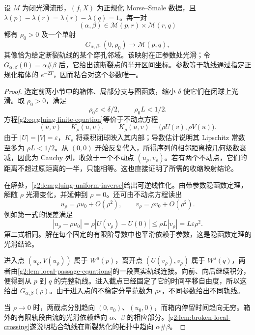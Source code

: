 \begin{theorem}\label{g2:thm:one-break-gluing}
	设 \(M\) 为闭光滑流形，\((f,X)\) 为正规化 Morse--Smale 数据，且 \(\lambda(p)-\lambda(r)=\lambda(r)-\lambda(q)=1\)。每一对
	\[
		(\alpha,\beta)\in\mathcal M(p,r)\times\mathcal M(r,q)
	\]
	都有 \(\rho_0>0\) 及一个单射
	\[
		G_{\alpha,\beta}:(0,\rho_0)\longrightarrow\mathcal M(p,q),
	\]
	其像恰为给定断裂轨线的某个穿孔邻域。该映射在正参数处光滑；令 \(G_{\alpha,\beta}(0)=\alpha\#\beta\) 后，它给出该断裂点的半开区间坐标。参数等于轨线通过指定正规化箱体的 \(e^{-2T}\)，因而粘合对这个参数唯一。
\end{theorem}
\begin{proof}
	选定前两小节中的箱体、局部分支与图函数，缩小 \(\delta\) 使它们在闭球上光滑。取 \(\rho_0>0\)，满足
	\[
		\rho_0\varepsilon<\delta/2,\qquad \rho_0L<1/2.
	\]
	方程\eqref{g2:eq:gluing-finite-equation}等价于不动点方程
	\[
		(u,v)=K_\rho(u,v),\qquad
		K_\rho(u,v)=\bigl(\rho U(v),\rho V(u)\bigr).
	\]
	由于 \(|U|=|V|=\varepsilon\)，\(K_\rho\) 将乘积闭球映入其内部；导数估计说明其 Lipschitz 常数至多为 \(\rho L<1/2\)。从 \((0,0)\) 开始反复代入，所得序列的相邻距离按几何级数衰减，因此为 Cauchy 列，收敛于一个不动点 \((u_\rho,v_\rho)\)。若有两个不动点，它们的距离不超过原距离的一半，只能相等。这也直接证明了所需的收缩映射结论。

	在解处，\cref{g2:lem:gluing-uniform-inverse}给出可逆线性化。由带参数隐函数定理，解随 \(\rho\) 光滑变化，并延伸到 \(\rho=0\)。还可由不动点方程读出
	\begin{equation}\label{g2:eq:gluing-first-order}
		u_\rho=\rho u_0+O(\rho^2),\qquad
		v_\rho=\rho v_0+O(\rho^2).
	\end{equation}
	例如第一式的误差满足
	\[
		|u_\rho-\rho u_0|
		=\rho|U(v_\rho)-U(0)|
		\le\rho L|v_\rho|
		=L\varepsilon\rho^2.
	\]
	第二式相同。解在每个固定的有限阶导数中也平滑依赖于参数，这是隐函数定理的光滑结论。

	进入点 \((u_\rho,V(u_\rho))\) 属于 \(W^u(p)\)，离开点 \((U(v_\rho),v_\rho)\) 属于 \(W^s(q)\)，两者由\cref{g2:lem:local-passage-equations}的一段真实轨线连接。向前、向后继续积分，便得到从 \(p\) 到 \(q\) 的完整轨线。进入截点已经固定了它的时间平移自由度，所以这给出 \(G_{\alpha,\beta}(\rho)\)。由于进入点的不稳定分量范数为 \(\rho\varepsilon\)，不同参数给出不同轨线。

	当 \(\rho\to0\) 时，两截点分别趋向 \((0,v_0)\)、\((u_0,0)\)，而箱内停留时间趋向无穷。箱外的有限轨段由流的光滑依赖趋向 \(\alpha\)、\(\beta\) 的相应部分。\cref{g2:lem:broken-local-crossing}遂说明粘合轨线在断裂紧化的拓扑中趋向 \(\alpha\#\beta\)。


\end{proof}
